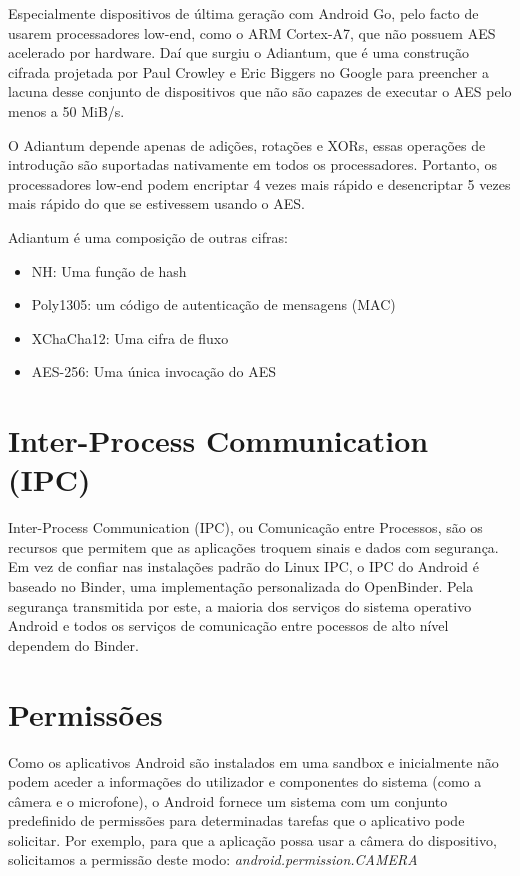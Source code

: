 \par Especialmente dispositivos de última geração com Android Go, pelo facto de usarem processadores low-end, como o ARM Cortex-A7, que não possuem AES acelerado por hardware.
Daí que surgiu o Adiantum, que é uma construção cifrada projetada por Paul Crowley e Eric Biggers no Google para preencher a lacuna desse conjunto de dispositivos que não são capazes de executar o AES pelo menos a 50 MiB/s. 
\par O Adiantum depende apenas de adições, rotações e XORs, essas operações de introdução são suportadas nativamente em todos os processadores. Portanto, os processadores low-end podem encriptar 4 vezes mais rápido e desencriptar 5 vezes mais rápido do que se estivessem usando o AES.
\\
\par Adiantum é uma composição de outras cifras:
\begin{itemize}
    \item NH: Uma função de hash
    \item Poly1305: um código de autenticação de mensagens (MAC)
    \item XChaCha12: Uma cifra de fluxo
    \item AES-256: Uma única invocação do AES
\end{itemize}

\section{Inter-Process Communication (IPC)}
Inter-Process Communication (IPC), ou Comunicação entre Processos, são os recursos que permitem que as aplicações troquem sinais e dados com segurança. Em vez de confiar nas instalações padrão do Linux IPC, o IPC do Android é baseado no Binder, uma implementação personalizada do OpenBinder. Pela segurança transmitida por este, a maioria dos serviços do sistema operativo Android e todos os serviços de comunicação entre pocessos de alto nível dependem do Binder.




\section{Permissões}
Como os aplicativos Android são instalados em uma sandbox e inicialmente não podem aceder a informações do utilizador e componentes do sistema (como a câmera e o microfone), o Android fornece um sistema com um conjunto predefinido de permissões para determinadas tarefas que o aplicativo pode solicitar. 
Por exemplo, para que a aplicação possa usar a câmera do dispositivo, solicitamos a permissão deste modo: \textit{android.permission.CAMERA}

